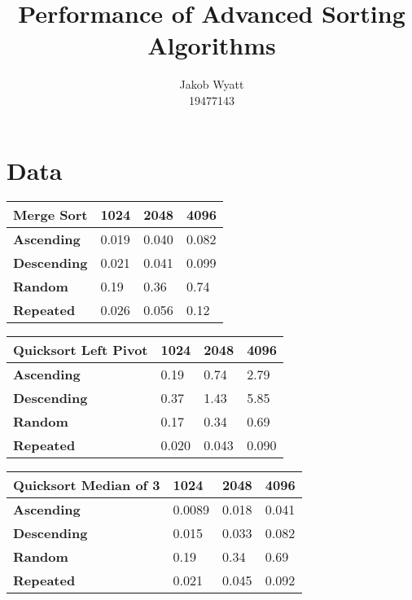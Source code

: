\documentclass{article}
\author{Jakob Wyatt\\19477143}
\title{Performance of Advanced Sorting Algorithms}
\begin{document}
\maketitle
\section{Data}

\begin{table}[H]
\centering
\begin{tabularx}{\linewidth}{| X | X | X | X |}
\hline
\textbf{Merge Sort} & \textbf{1024} & \textbf{2048} & \textbf{4096} \\
\hline
\textbf{Ascending} & 0.019 & 0.040 & 0.082 \\
\hline
\textbf{Descending} & 0.021 & 0.041 & 0.099 \\
\hline
\textbf{Random}  & 0.19 & 0.36 & 0.74 \\
\hline
\textbf{Repeated} & 0.026 & 0.056 & 0.12 \\
\hline
\end{tabularx}
\end{table}

\begin{table}[H]
\centering
\begin{tabularx}{\linewidth}{| X | X | X | X |}
\hline
\textbf{Quicksort Left Pivot} & \textbf{1024} & \textbf{2048} & \textbf{4096} \\
\hline
\textbf{Ascending} & 0.19 & 0.74 & 2.79 \\
\hline
\textbf{Descending} & 0.37 & 1.43 & 5.85 \\
\hline
\textbf{Random}  & 0.17 & 0.34 & 0.69 \\
\hline
\textbf{Repeated} & 0.020 & 0.043 & 0.090 \\
\hline
\end{tabularx}
\end{table}

\begin{table}[H]
\centering
\begin{tabularx}{\linewidth}{| X | X | X | X |}
\hline
\textbf{Quicksort Median of 3} & \textbf{1024} & \textbf{2048} & \textbf{4096} \\
\hline
\textbf{Ascending} & 0.0089 & 0.018 & 0.041 \\
\hline
\textbf{Descending} & 0.015 & 0.033 & 0.082 \\
\hline
\textbf{Random}  & 0.19 & 0.34 & 0.69 \\
\hline
\textbf{Repeated} & 0.021 & 0.045 & 0.092 \\
\hline
\end{tabularx}
\end{table}
\end{document}
